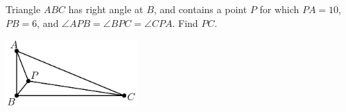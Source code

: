 Triangle $ABC$ has right angle at $B$, and contains a point $P$ for which $PA = 10$, $PB = 6$, and $\angle APB = \angle BPC = \angle CPA$.  Find $PC$.

\begin{center}
\includegraphics[width = 50.400000000000006mm]{img/fig0.png}
\end{center}